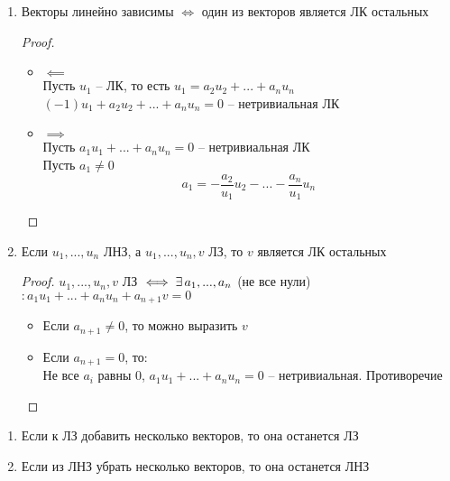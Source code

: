 \begin{props}
	\item
    \begin{enumerate}
    	\item Векторы линейно зависимы $\iff$ один из векторов является ЛК остальных
        \begin{proof}
        	\hfill
            \begin{itemize}
            	\item $\impliedby$ \\
                Пусть $u_1$ -- ЛК, то есть $u_1 = a_2u_2 + ... + a_nu_n $ \\
                $ (-1)u_1 + a_2u_2 + ... + a_nu_n = 0 $ -- нетривиальная ЛК
                \item $\implies$ \\
                Пусть $a_1u_1 + ... + a_nu_n = 0 $ -- нетривиальная ЛК \\
                Пусть $a_1 \ne 0$
                $$ a_1 = -\frac{a_2}{u_1}u_2 - ... - \frac{a_n}{u_1}u_n $$
            \end{itemize}
        \end{proof}
        \item Если $u_1, ..., u_n$ ЛНЗ, а $u_1, ..., u_n, v$ ЛЗ, то $v$ является ЛК остальных
        \begin{proof}
            $u_1, ..., u_n, v$ ЛЗ $ \iff \exists\, a_1, ..., a_n $ (не все нули) $ : a_1u_1 + ... + a_nu_n + a_{n + 1}v = 0 $
            \begin{itemize}
            	\item Если $a_{n + 1} \ne 0 $, то можно выразить $v$
                \item Если $a_{n + 1} = 0 $, то: \\
                Не все $a_i$ равны 0, $a_1u_1 + ... + a_nu_n = 0 $ -- нетривиальная. Противоречие
            \end{itemize}
        \end{proof}
    \end{enumerate}
    \item
    \begin{enumerate}
    	\item Если к ЛЗ добавить несколько векторов, то она останется ЛЗ
        \item Если из ЛНЗ убрать несколько векторов, то она останется ЛНЗ
    \end{enumerate}
    \item
    \begin{enumerate}

\end{enumerate}
\end{props}
